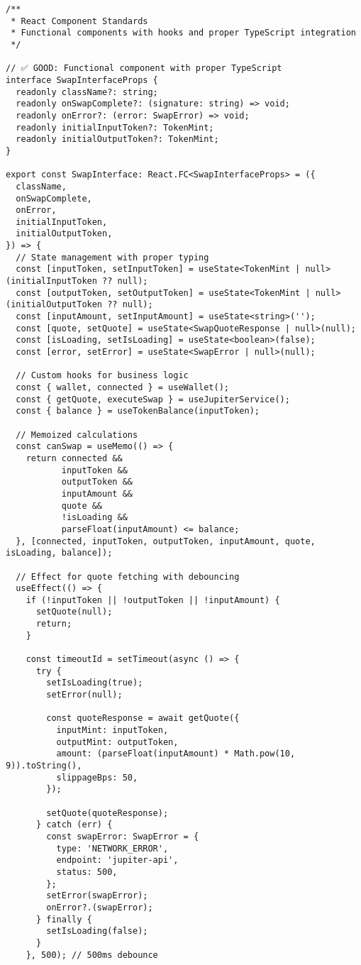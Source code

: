 \documentclass[11pt,a4paper]{article}
\begin{document}
\begin{lstlisting}[style=typescript, caption=React Component Standards]
/**
 * React Component Standards
 * Functional components with hooks and proper TypeScript integration
 */

// ✅ GOOD: Functional component with proper TypeScript
interface SwapInterfaceProps {
  readonly className?: string;
  readonly onSwapComplete?: (signature: string) => void;
  readonly onError?: (error: SwapError) => void;
  readonly initialInputToken?: TokenMint;
  readonly initialOutputToken?: TokenMint;
}

export const SwapInterface: React.FC<SwapInterfaceProps> = ({
  className,
  onSwapComplete,
  onError,
  initialInputToken,
  initialOutputToken,
}) => {
  // State management with proper typing
  const [inputToken, setInputToken] = useState<TokenMint | null>(initialInputToken ?? null);
  const [outputToken, setOutputToken] = useState<TokenMint | null>(initialOutputToken ?? null);
  const [inputAmount, setInputAmount] = useState<string>('');
  const [quote, setQuote] = useState<SwapQuoteResponse | null>(null);
  const [isLoading, setIsLoading] = useState<boolean>(false);
  const [error, setError] = useState<SwapError | null>(null);

  // Custom hooks for business logic
  const { wallet, connected } = useWallet();
  const { getQuote, executeSwap } = useJupiterService();
  const { balance } = useTokenBalance(inputToken);

  // Memoized calculations
  const canSwap = useMemo(() => {
    return connected && 
           inputToken && 
           outputToken && 
           inputAmount && 
           quote && 
           !isLoading &&
           parseFloat(inputAmount) <= balance;
  }, [connected, inputToken, outputToken, inputAmount, quote, isLoading, balance]);

  // Effect for quote fetching with debouncing
  useEffect(() => {
    if (!inputToken || !outputToken || !inputAmount) {
      setQuote(null);
      return;
    }

    const timeoutId = setTimeout(async () => {
      try {
        setIsLoading(true);
        setError(null);
        
        const quoteResponse = await getQuote({
          inputMint: inputToken,
          outputMint: outputToken,
          amount: (parseFloat(inputAmount) * Math.pow(10, 9)).toString(),
          slippageBps: 50,
        });
        
        setQuote(quoteResponse);
      } catch (err) {
        const swapError: SwapError = {
          type: 'NETWORK_ERROR',
          endpoint: 'jupiter-api',
          status: 500,
        };
        setError(swapError);
        onError?.(swapError);
      } finally {
        setIsLoading(false);
      }
    }, 500); // 500ms debounce


\end{lstlisting}
\end{document}
